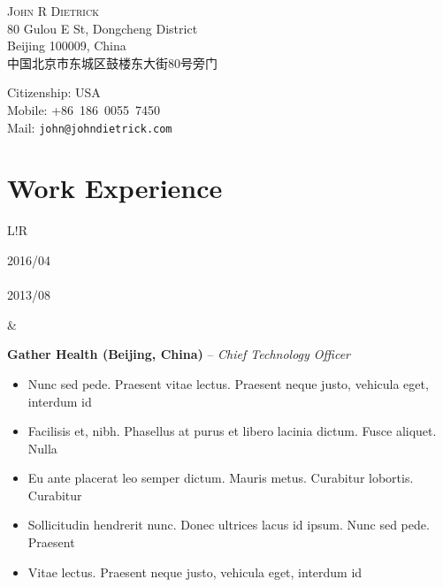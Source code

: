 \documentclass[10pt]{article}
\newcommand\VRule{\color{lightgray}\vrule width 0.5pt}
\begin{document}
\begin{CJK}{UTF8}{gbsn}

\vspace{0pt}
\begin{center}
    \flushleft
    \begin{minipage}[b]{0.45\linewidth}
        \vspace{0pt}
        {\huge\textsc{John R Dietrick}}\\
        80 Gulou E St, Dongcheng District\\
        Beijing 100009, China\\
        中国北京市东城区鼓楼东大街80号旁门
    \end{minipage}
    \begin{minipage}[b]{0.45\linewidth}
        \vspace{0pt}
        Citizenship: USA\\
        Mobile: +86~186~0055~7450\\
        Mail: \texttt{john@johndietrick.com}
    \end{minipage}
\end{center}

\vspace{-6pt}

\section*{Work Experience}
\begin{tabular}{L!{\VRule}R}
    \parbox[t]{1.0\linewidth}{\centering
        {\scriptsize 2016/04}\\
        {\tiny \raisebox{.15em}{$\mid$}}\\
        {\scriptsize 2013/08}
    }&
    \parbox[t]{1.0\linewidth}{
        {\bf Gather Health (Beijing, China)} -- \textit{Chief Technology Officer}\\
        \vspace{-8pt}
        \begin{itemize}[leftmargin=16pt]
            \item Nunc sed pede. Praesent vitae lectus. Praesent neque justo, vehicula eget, interdum id
            \item Facilisis et, nibh. Phasellus at purus et libero lacinia dictum. Fusce aliquet. Nulla
            \item Eu ante placerat leo semper dictum. Mauris metus. Curabitur lobortis. Curabitur
            \item Sollicitudin hendrerit nunc. Donec ultrices lacus id ipsum. Nunc sed pede. Praesent
            \item Vitae lectus. Praesent neque justo, vehicula eget, interdum id
        \end{itemize}
    }\\


\end{tabular}
\end{CJK}
\end{document}
